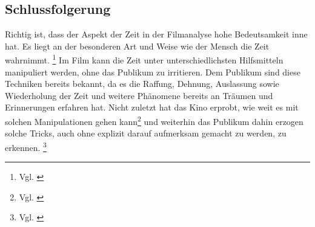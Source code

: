 \subsection{Schlussfolgerung}

Richtig ist, dass der Aspekt der Zeit in der Filmanalyse hohe Bedeutsamkeit inne hat. Es liegt an der besonderen Art und Weise wie der Mensch die Zeit wahrnimmt. \footnote{Vgl. \cite[S. 204]{keutzer2014filmanalyse}} Im Film kann die Zeit unter unterschiedlichsten Hilfsmitteln manipuliert werden, ohne das Publikum zu irritieren. Dem Publikum sind diese Techniken bereits bekannt, da es die Raffung, Dehnung, Auslassung sowie Wiederholung der Zeit und weitere Phänomene bereits an Träumen und Erinnerungen erfahren hat. Nicht zuletzt hat das Kino erprobt, wie weit es mit solchen Manipulationen gehen kann\footnote{Vgl. \cite[S. 216]{keutzer2014filmanalyse}} und weiterhin das Publikum dahin erzogen solche Tricks, auch ohne explizit darauf aufmerksam gemacht zu werden, zu erkennen. \footnote{Vgl. \cite[S. 216]{keutzer2014filmanalyse}} 


%

%

%





%

%

%
%
%
%


 

 
%
%
%

%

%

%

%
%
%

%
%

%

%
%
%






